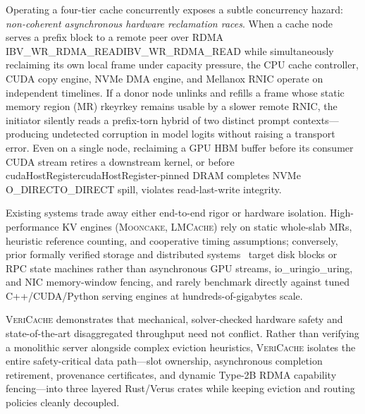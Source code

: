 \documentclass[11pt,a4paper]{article}
\let\origunderscore\_
\DeclareRobustCommand{\code}[1]{{\ttfamily\ifmmode #1\else\def\_{\origunderscore\hspace{0pt}}#1\fi}}
\newcommand{\VC}{\textsc{VeriCache}}
\newcommand{\MC}{\textsc{Mooncake}}
\newcommand{\LM}{\textsc{LMCache}}
\begin{document}
Operating a four-tier cache concurrently exposes a subtle concurrency hazard: \emph{non-coherent asynchronous hardware reclamation races}. When a cache node serves a prefix block to a remote peer over RDMA \code{IBV\_WR\_RDMA\_READ} while simultaneously reclaiming its own local frame under capacity pressure, the CPU cache controller, CUDA copy engine, NVMe DMA engine, and Mellanox RNIC operate on independent timelines. If a donor node unlinks and refills a frame whose static memory region (MR) \code{rkey} remains usable by a slower remote RNIC, the initiator silently reads a prefix-torn hybrid of two distinct prompt contexts---producing undetected corruption in model logits without raising a transport error. Even on a single node, reclaiming a GPU HBM buffer before its consumer CUDA stream retires a downstream kernel, or before \code{cudaHostRegister}-pinned DRAM completes NVMe \code{O\_DIRECT} spill, violates read-last-write integrity.

Existing systems trade away either end-to-end rigor or hardware isolation. High-performance KV engines (\MC{}, \LM{}) rely on static whole-slab MRs, heuristic reference counting, and cooperative timing assumptions; conversely, prior formally verified storage and distributed systems~\cite{ironfleet,verdi,veribetrfs,daisynfs} target disk blocks or RPC state machines rather than asynchronous GPU streams, \code{io\_uring}, and NIC memory-window fencing, and rarely benchmark directly against tuned C++/CUDA/Python serving engines at hundreds-of-gigabytes scale.

\VC{} demonstrates that mechanical, solver-checked hardware safety and state-of-the-art disaggregated throughput need not conflict. Rather than verifying a monolithic server alongside complex eviction heuristics, \VC{} isolates the entire safety-critical data path---slot ownership, asynchronous completion retirement, provenance certificates, and dynamic Type-2B RDMA capability fencing---into three layered Rust/Verus crates while keeping eviction and routing policies cleanly decoupled.
\end{document}
